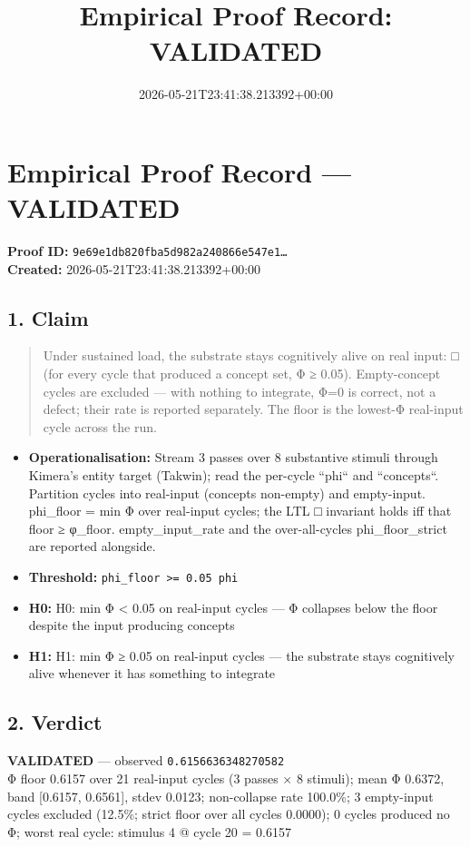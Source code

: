\documentclass{article}
\title{Empirical Proof Record: VALIDATED}
\date{2026-05-21T23:41:38.213392+00:00}
\begin{document}
\maketitle
\section*{Empirical Proof Record --- \textcolor{validated}{\textbf{VALIDATED}}}
\textbf{Proof ID:} \texttt{9e69e1db820fba5d982a240866e547e1\dots}\\
\textbf{Created:} 2026-05-21T23:41:38.213392+00:00
\subsection*{1. Claim}
\begin{quote}Under sustained load, the substrate stays cognitively alive on real input: □ (for every cycle that produced a concept set, Φ ≥ 0.05). Empty-concept cycles are excluded — with nothing to integrate, Φ=0 is correct, not a defect; their rate is reported separately. The floor is the lowest-Φ real-input cycle across the run.\end{quote}
\begin{itemize}
\item \textbf{Operationalisation:} Stream 3 passes over 8 substantive stimuli through Kimera's entity target (Takwin); read the per-cycle ``phi`` and ``concepts``. Partition cycles into real-input (concepts non-empty) and empty-input. phi\_floor = min Φ over real-input cycles; the LTL □ invariant holds iff that floor ≥ φ\_floor. empty\_input\_rate and the over-all-cycles phi\_floor\_strict are reported alongside.
\item \textbf{Threshold:} \texttt{phi\_floor >= 0.05 phi}
\item \textbf{H0:} H0: min Φ < 0.05 on real-input cycles — Φ collapses below the floor despite the input producing concepts
\item \textbf{H1:} H1: min Φ ≥ 0.05 on real-input cycles — the substrate stays cognitively alive whenever it has something to integrate
\end{itemize}
\subsection*{2. Verdict}
\textcolor{validated}{\textbf{VALIDATED}} --- observed \texttt{0.6156636348270582}\\
Φ floor 0.6157 over 21 real-input cycles (3 passes × 8 stimuli); mean Φ 0.6372, band [0.6157, 0.6561], stdev 0.0123; non-collapse rate 100.0\%; 3 empty-input cycles excluded (12.5\%; strict floor over all cycles 0.0000); 0 cycles produced no Φ; worst real cycle: stimulus 4 @ cycle 20 = 0.6157
\end{document}
